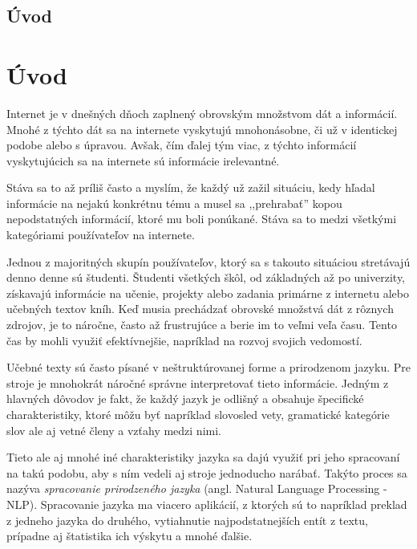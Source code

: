 \newpage
{}
{
	\section{Úvod}
}
{
	\chapter{Úvod}
}
Internet je v dnešných dňoch zaplnený obrovským množstvom dát a informácií. Mnohé z týchto dát sa na internete vyskytujú mnohonásobne, či už v identickej podobe alebo s úpravou. Avšak, čím ďalej tým viac, z týchto informácií vyskytujúcich sa na internete sú informácie irelevantné.

Stáva sa to až príliš často a myslím, že každý už zažil situáciu, kedy hľadal informácie na nejakú konkrétnu tému a musel sa ,,prehrabať'' kopou nepodstatných informácií, ktoré mu boli ponúkané. Stáva sa to medzi všetkými kategóriami používateľov na internete.

Jednou z majoritných skupín používateľov, ktorý sa s takouto situáciou stretávajú denno denne sú študenti. Študenti všetkých škôl, od základných až po univerzity, získavajú informácie na učenie, projekty alebo zadania primárne z internetu alebo učebných textov kníh. Keď musia prechádzať obrovské množstvá dát z rôznych zdrojov, je to náročne, často až frustrujúce a berie im to veľmi veľa času. Tento čas by mohli využiť efektívnejšie, napríklad na rozvoj svojich vedomostí.

Učebné texty sú často písané v neštruktúrovanej forme a prirodzenom jazyku. Pre stroje je mnohokrát náročné správne interpretovať tieto informácie. Jedným z hlavných dôvodov je fakt, že každý jazyk je odlišný a obsahuje špecifické charakteristiky, ktoré môžu byť napríklad slovosled vety, gramatické kategórie slov ale aj vetné členy a vzťahy medzi nimi.

Tieto ale aj mnohé iné charakteristiky jazyka sa dajú využiť pri jeho spracovaní na takú podobu, aby s ním vedeli aj stroje jednoducho narábať. Takýto proces sa nazýva \textit{spracovanie prirodzeného jazyka} (angl. Natural Language Processing - NLP). Spracovanie jazyka ma viacero aplikácií, z ktorých sú to napríklad preklad z jedneho jazyka do druhého, vytiahnutie najpodstatnejších entít z textu, prípadne aj štatistika ich výskytu a mnohé ďalšie.

